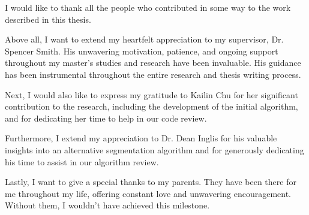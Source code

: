 
I would like to thank all the people who contributed in some way to the work described in this thesis.

Above all, I want to extend my heartfelt appreciation to my supervisor, Dr. Spencer Smith. His unwavering motivation, patience, and ongoing support throughout my master's studies and research have been invaluable. His guidance has been instrumental throughout the entire research and thesis writing process.

Next, I would also like to express my gratitude to Kailin Chu for her significant contribution to the research, including the development of the initial algorithm, and for dedicating her time to help in our code review.

Furthermore, I extend my appreciation to Dr. Dean Inglis for his valuable insights into an alternative segmentation algorithm and for generously dedicating his time to assist in our algorithm review.

Lastly, I want to give a special thanks to my parents. They have been there for me throughout my life, offering constant love and unwavering encouragement. Without them, I wouldn't have achieved this milestone.